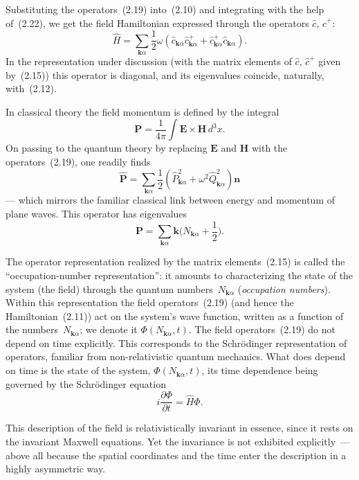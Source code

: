 Substituting the operators~(2.19) into~(2.10) and integrating with the help of~(2.22), we get the field Hamiltonian expressed through the operators $\hat{c}$, $\hat{c}^+$:
\begin{equation}
\hat{H} = \sum_{\mathbf{k}\alpha} \frac{1}{2}\omega(\hat{c}_{\mathbf{k}\alpha}\hat{c}_{\mathbf{k}\alpha}^+ + \hat{c}_{\mathbf{k}\alpha}^+\hat{c}_{\mathbf{k}\alpha}).
\tag{2.23}
\end{equation}
In the representation under discussion (with the matrix elements of $\hat{c}$, $\hat{c}^+$ given by~(2.15)) this operator is diagonal, and its eigenvalues coincide, naturally, with~(2.12).

In classical theory the field momentum is defined by the integral
\[
\mathbf{P} = \frac{1}{4\pi}\int \mathbf{E}\times\mathbf{H}\,d^3x.
\]
On passing to the quantum theory by replacing $\mathbf{E}$ and $\mathbf{H}$ with the operators~(2.19), one readily finds
\begin{equation}
\hat{\mathbf{P}} = \sum_{\mathbf{k}\alpha} \frac{1}{2}(\hat{P}_{\mathbf{k}\alpha}^2 + \omega^2\hat{Q}_{\mathbf{k}\alpha}^2)\mathbf{n}
\tag{2.24}
\end{equation}
--- which mirrors the familiar classical link between energy and momentum of plane waves. This operator has eigenvalues
\begin{equation}
\mathbf{P} = \sum_{\mathbf{k}\alpha} \mathbf{k}\biggl(N_{\mathbf{k}\alpha} + \frac{1}{2}\biggr).
\tag{2.25}
\end{equation}

The operator representation realized by the matrix elements~(2.15) is called the ``occupation-number representation'': it amounts to characterizing the state of the system (the field) through the quantum numbers~$N_{\mathbf{k}\alpha}$ (\emph{occupation numbers}). Within this representation the field operators~(2.19) (and hence the Hamiltonian~(2.11)) act on the system's wave function, written as a function of the
numbers~$N_{\mathbf{k}\alpha}$; we denote it $\Phi(N_{\mathbf{k}\alpha},t)$. The field operators~(2.19) do not depend on time explicitly. This corresponds to the Schr\"odinger representation of operators, familiar from non-relativistic quantum mechanics. What does depend on time is the state of the system, $\Phi(N_{\mathbf{k}\alpha},t)$, its time dependence being governed by the Schr\"odinger equation
\[
i\frac{\partial\Phi}{\partial t} = \hat{H}\Phi.
\]

This description of the field is relativistically invariant in essence, since it rests on the invariant Maxwell equations. Yet the invariance is not exhibited explicitly~--- above all because the spatial coordinates and the time enter the description in a highly asymmetric way.

